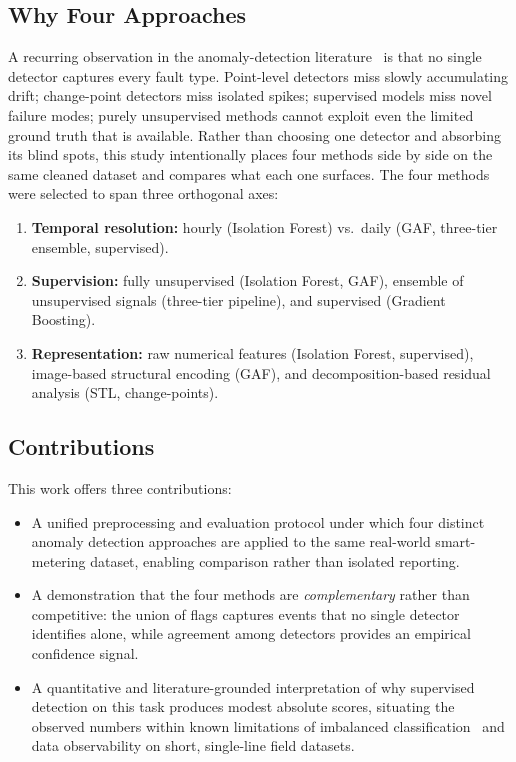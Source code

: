 \documentclass{article}
\begin{document}
\subsection*{Why Four Approaches}
A recurring observation in the anomaly-detection literature~\cite{chandola2009anomaly,aggarwal2017outlier,aggarwal2017ensemble} is that no single detector captures every fault type. Point-level detectors miss slowly accumulating drift; change-point detectors miss isolated spikes; supervised models miss novel failure modes; purely unsupervised methods cannot exploit even the limited ground truth that is available. Rather than choosing one detector and absorbing its blind spots, this study intentionally places four methods side by side on the same cleaned dataset and compares what each one surfaces. The four methods were selected to span three orthogonal axes:

\begin{enumerate}[leftmargin=1.5em,itemsep=1pt]
  \item \textbf{Temporal resolution:} hourly (Isolation Forest) vs.\ daily (GAF, three-tier ensemble, supervised).
  \item \textbf{Supervision:} fully unsupervised (Isolation Forest, GAF), ensemble of unsupervised signals (three-tier pipeline), and supervised (Gradient Boosting).
  \item \textbf{Representation:} raw numerical features (Isolation Forest, supervised), image-based structural encoding (GAF), and decomposition-based residual analysis (STL, change-points).
\end{enumerate}

\subsection*{Contributions}
This work offers three contributions:

\begin{itemize}[leftmargin=1.5em,itemsep=1pt]
  \item A unified preprocessing and evaluation protocol under which four distinct anomaly detection approaches are applied to the same real-world smart-metering dataset, enabling comparison rather than isolated reporting.
  \item A demonstration that the four methods are \emph{complementary} rather than competitive: the union of flags captures events that no single detector identifies alone, while agreement among detectors provides an empirical confidence signal.
  \item A quantitative and literature-grounded interpretation of why supervised detection on this task produces modest absolute scores, situating the observed numbers within known limitations of imbalanced classification~\cite{saito2015precision,hand2009measuring} and data observability on short, single-line field datasets.
\end{itemize}
\end{document}
